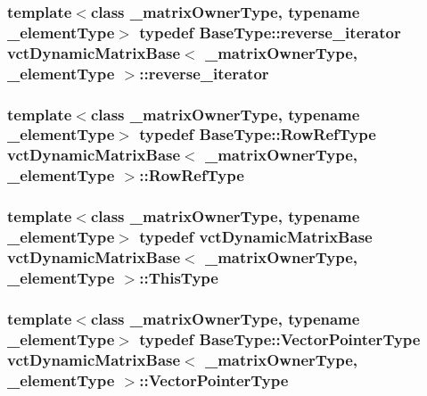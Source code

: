 \subsubsection[{reverse\+\_\+iterator}]{\setlength{\rightskip}{0pt plus 5cm}template$<$class \+\_\+matrix\+Owner\+Type, typename \+\_\+element\+Type$>$ typedef {\bf Base\+Type\+::reverse\+\_\+iterator} {\bf vct\+Dynamic\+Matrix\+Base}$<$ \+\_\+matrix\+Owner\+Type, \+\_\+element\+Type $>$\+::{\bf reverse\+\_\+iterator}}\label{classvct_dynamic_matrix_base_a5390b4a252fc2e2bbe94cbd19f8c9fa2}
\hypertarget{classvct_dynamic_matrix_base_a32b85f46bce5ec110e29208e241f82c3}{}
\subsubsection[{Row\+Ref\+Type}]{\setlength{\rightskip}{0pt plus 5cm}template$<$class \+\_\+matrix\+Owner\+Type, typename \+\_\+element\+Type$>$ typedef {\bf Base\+Type\+::\+Row\+Ref\+Type} {\bf vct\+Dynamic\+Matrix\+Base}$<$ \+\_\+matrix\+Owner\+Type, \+\_\+element\+Type $>$\+::{\bf Row\+Ref\+Type}}\label{classvct_dynamic_matrix_base_a32b85f46bce5ec110e29208e241f82c3}
\hypertarget{classvct_dynamic_matrix_base_afc70802fd7c3e318e8bad4532b945f82}{}
\subsubsection[{This\+Type}]{\setlength{\rightskip}{0pt plus 5cm}template$<$class \+\_\+matrix\+Owner\+Type, typename \+\_\+element\+Type$>$ typedef {\bf vct\+Dynamic\+Matrix\+Base} {\bf vct\+Dynamic\+Matrix\+Base}$<$ \+\_\+matrix\+Owner\+Type, \+\_\+element\+Type $>$\+::{\bf This\+Type}}\label{classvct_dynamic_matrix_base_afc70802fd7c3e318e8bad4532b945f82}
\hypertarget{classvct_dynamic_matrix_base_a58735349c10ccb0b0b1708b52e3a1569}{}
\subsubsection[{Vector\+Pointer\+Type}]{\setlength{\rightskip}{0pt plus 5cm}template$<$class \+\_\+matrix\+Owner\+Type, typename \+\_\+element\+Type$>$ typedef {\bf Base\+Type\+::\+Vector\+Pointer\+Type} {\bf vct\+Dynamic\+Matrix\+Base}$<$ \+\_\+matrix\+Owner\+Type, \+\_\+element\+Type $>$\+::{\bf Vector\+Pointer\+Type}}\label{classvct_dynamic_matrix_base_a58735349c10ccb0b0b1708b52e3a1569}


